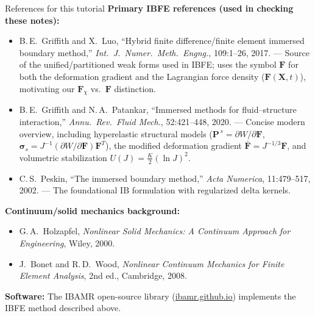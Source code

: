 \documentclass[aspectratio=169]{beamer}
\newcommand{\X}{\bm{X}}
\newcommand{\sigmaC}{\bm{\sigma}} %
\newcommand{\Fdef}{\bm{F}_{\chi}}  %
\newcommand{\Pten}{\bm{P}}         %
\newcommand{\FLag}{\bm{F}}         %
\begin{document}
\begin{frame}{References for this tutorial}
\footnotesize
\textbf{Primary IBFE references (used in checking these notes):}
\begin{itemize}
\item B.\,E.\ Griffith and X.\ Luo, ``Hybrid finite difference/finite element immersed boundary method,'' \emph{Int.\ J.\ Numer.\ Meth.\ Engng.}, 109:1--26, 2017. --- Source of the unified/partitioned weak forms used in IBFE; uses the symbol \(\bm{F}\) for both the deformation gradient and the Lagrangian force density (\(\bm{F}(\X,t)\)), motivating our \(\Fdef\) vs.\ \(\FLag\) distinction.
\item B.\,E.\ Griffith and N.\,A.\ Patankar, ``Immersed methods for fluid--structure interaction,'' \emph{Annu.\ Rev.\ Fluid Mech.}, 52:421--448, 2020. --- Concise modern overview, including hyperelastic structural models (\(\Pten^{\,s}=\partial W/\partial \bm{F}\), \(\sigmaC_s = J^{-1}(\partial W/\partial \bm{F})\bm{F}^T\)), the modified deformation gradient \(\bar{\bm{F}}=J^{-1/3}\bm{F}\), and volumetric stabilization \(U(J)=\tfrac{K}{2}(\ln J)^2\).
\item C.\,S.\ Peskin, ``The immersed boundary method,'' \emph{Acta Numerica}, 11:479--517, 2002. --- The foundational IB formulation with regularized delta kernels.
\end{itemize}

\medskip
\textbf{Continuum/solid mechanics background:}
\begin{itemize}
\item G.\,A.\ Holzapfel, \emph{Nonlinear Solid Mechanics: A Continuum Approach for Engineering}, Wiley, 2000.
\item J.\ Bonet and R.\,D.\ Wood, \emph{Nonlinear Continuum Mechanics for Finite Element Analysis}, 2nd ed., Cambridge, 2008.
\end{itemize}

\medskip
\textbf{Software:} The IBAMR open-source library (\href{https://ibamr.github.io}{ibamr.github.io}) implements the IBFE method described above.
\end{frame}
\end{document}
